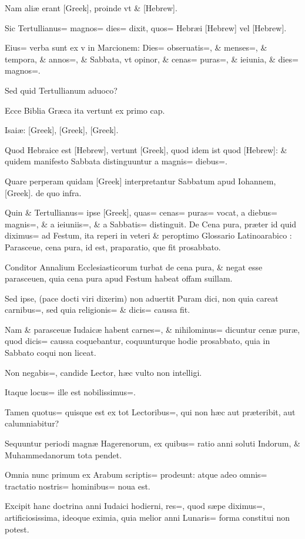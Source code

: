 \begin{parnumbers}
Nam aliæ erant [Greek], proinde vt \& [Hebrew].

Sic Tertullianus= magnos= dies= dixit, quos= Hebræi [Hebrew] vel [Hebrew].

Eius= verba sunt ex v in Marcionem: Dies= obseruatis=, \& menses=, \& tempora, \& annos=, \& Sabbata, vt opinor, \& cenas= puras=, \& ieiunia, \& dies= magnos=. 

Sed quid Tertullianum aduoco?

Ecce Biblia Græca ita vertunt ex primo cap.

Isaiæ: [Greek], [Greek], [Greek].

Quod Hebraice est [Hebrew], vertunt [Greek], quod idem ist quod [Hebrew]: \& quidem manifesto Sabbata distinguuntur a magnis= diebus=. 

Quare perperam quidam [Greek] interpretantur Sabbatum apud Iohannem, [Greek]. de quo infra.

Quin \& Tertullianus= ipse [Greek], quas= cenas= puras= vocat, a diebus= magnis=, \& a ieiuniis=, \& a Sabbatis= distinguit. De Cena pura, præter id quid diximus= ad Festum, ita reperi in veteri \& peroptimo Glossario Latinoarabico : Parasceue, cena pura, id est, praparatio, que fit prosabbato.

Conditor Annalium Ecclesiasticorum turbat de cena pura, \& negat esse parasceuen, quia cena pura apud Festum habeat offam suillam.

Sed ipse, (pace docti viri dixerim) non aduertit Puram dici, non quia careat carnibus=, sed quia religionis= \& dicis= caussa fit.

Nam \& parasceuæ Iudaicæ habent carnes=, \& nihilominus= dicuntur cenæ puræ, quod dicis= caussa coquebantur, coquunturque hodie prosabbato, quia in Sabbato coqui non liceat.

Non negabis=, candide Lector, hæc vulto non intelligi.

Itaque locus= ille est nobilissimus=. 

Tamen quotus= quisque est ex tot Lectoribus=, qui non hæc aut præteribit, aut calumniabitur?

Sequuntur periodi magnæ Hagerenorum, ex quibus= ratio anni soluti Indorum, \& Muhammedanorum tota pendet.

Omnia nunc primum ex Arabum scriptis= prodeunt: atque adeo omnis= tractatio nostris= hominibus= noua est.

Excipit hanc doctrina anni Iudaici hodierni, res=, quod sæpe diximus=, artificiosissima, ideoque eximia, quia melior
anni Lunaris= forma constitui non potest.


\end{parnumbers}
